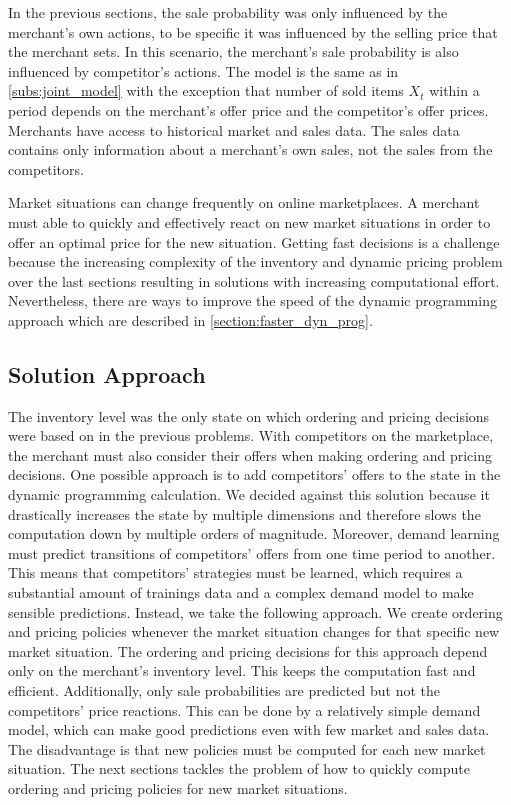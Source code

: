 In the previous sections, the sale probability was only influenced by the merchant's own actions, to be specific it was influenced by the selling price that the merchant sets.
In this scenario, the merchant's sale probability is also influenced by competitor's actions.
The model is the same as in \cref{subs:joint_model} with the exception that number of sold items $X_t$ within a period depends on the merchant's offer price and the competitor's offer prices.
Merchants have access to historical market and sales data.
The sales data contains only information about a merchant's own sales, not the sales from the competitors.

Market situations can change frequently on online marketplaces.
A merchant must able to quickly and effectively react on new market situations in order to offer an optimal price for the new situation.
Getting fast decisions is a challenge because the increasing complexity of the inventory and dynamic pricing problem over the last sections resulting in solutions with increasing computational effort.
Nevertheless, there are ways to improve the speed of the dynamic programming approach which are described in \cref{section:faster_dyn_prog}.

\subsection{Solution Approach}




The inventory level was the only state on which ordering and pricing decisions were based on in the previous problems.
With competitors on the marketplace, the merchant must also consider their offers when making ordering and pricing decisions.
One possible approach is to add competitors' offers to the state in the dynamic programming calculation.
We decided against this solution because it drastically increases the state by multiple dimensions and therefore slows the computation down by multiple orders of magnitude.
Moreover, demand learning must predict transitions of competitors' offers from one time period to another.
This means that competitors' strategies must be learned, which requires a substantial amount of trainings data and a complex demand model to make sensible predictions.
Instead, we take the following approach.
We create ordering and pricing policies whenever the market situation changes for that specific new market situation.
The ordering and pricing decisions for this approach depend only on the merchant's inventory level.
This keeps the computation fast and efficient.
Additionally, only sale probabilities are predicted but not the competitors' price reactions.
This can be done by a relatively simple demand model, which can make good predictions even with few market and sales data.
The disadvantage is that new policies must be computed for each new market situation.
The next sections tackles the problem of how to quickly compute ordering and pricing policies for new market situations.

